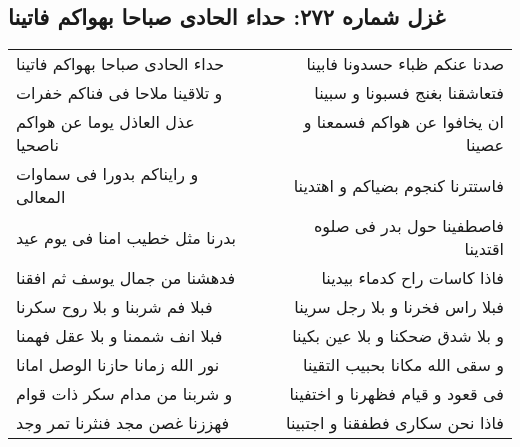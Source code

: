 \begin{center}
\section*{غزل شماره ۲۷۲: حداء الحادی صباحا بهواکم فاتینا}
\label{sec:0272}
\begin{longtable}{l p{0.5cm} r}
حداء الحادی صباحا بهواکم فاتینا
&&
صدنا عنکم ظباء حسدونا فابینا
\\
و تلاقینا ملاحا فی فناکم خفرات
&&
فتعاشقنا بغنج فسبونا و سبینا
\\
عذل العاذل یوما عن هواکم ناصحیا
&&
ان یخافوا عن هواکم فسمعنا و عصینا
\\
و رایناکم بدورا فی سماوات المعالی
&&
فاستترنا کنجوم بضیاکم و اهتدینا
\\
بدرنا مثل خطیب امنا فی یوم عید
&&
فاصطفینا حول بدر فی صلوه اقتدینا
\\
فدهشنا من جمال یوسف ثم افقنا
&&
فاذا کاسات راح کدماء بیدینا
\\
فبلا فم شربنا و بلا روح سکرنا
&&
فبلا راس فخرنا و بلا رجل سرینا
\\
فبلا انف شممنا و بلا عقل فهمنا
&&
و بلا شدق ضحکنا و بلا عین بکینا
\\
نور الله زمانا حازنا الوصل امانا
&&
و سقی الله مکانا بحبیب التقینا
\\
و شربنا من مدام سکر ذات قوام
&&
فی قعود و قیام فظهرنا و اختفینا
\\
فهززنا غصن مجد فنثرنا تمر وجد
&&
فاذا نحن سکاری فطفقنا و اجتبینا
\\
\end{longtable}
\end{center}

